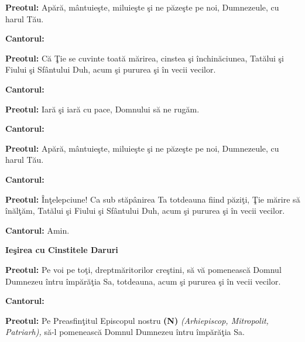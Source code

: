 \documentclass[11pt,letterpaper]{book} \usepackage{ucs}
\newcommand{\mysection}[1]{\begin{center}{\Large \bf #1}\end{center}}
\begin{document}
  {\bf Preotul:} Apără, mântuieşte, miluieşte şi ne păzeşte pe noi,
  Dumnezeule, cu harul Tău.

  {\bf Cantorul:}
  \begin{center}
  \end{center}

  {\bf Preotul:} Că Ţie se cuvinte toată mărirea, cinstea şi
  închinăciunea, Tatălui şi Fiului şi Sfântului Duh, acum şi pururea
  şi în vecii vecilor.

  {\bf Cantorul:}
  \begin{center}
  \end{center}

  {\bf Preotul:} Iară şi iară cu pace, Domnului să ne rugăm.

  {\bf Cantorul:}
  \begin{center}
  \end{center}

  {\bf Preotul:} Apără, mântuieşte, miluieşte şi ne păzeşte pe noi,
  Dumnezeule, cu harul Tău.

  {\bf Cantorul:}
  \begin{center}
  \end{center}

  {\bf Preotul:} Înţelepciune! Ca sub stăpânirea Ta totdeauna fiind
  păziţi, Ţie mărire să înălţăm, Tatălui şi Fiului şi Sfântului Duh,
  acum şi pururea şi în vecii vecilor.

  {\bf Cantorul:} Amin.


  \vspace{0.8in}

  
  \mysection{Ieşirea cu Cinstitele Daruri}

  {\bf Preotul:} Pe voi pe toţi, dreptmăritorilor creştini, să vă
  pomenească Domnul Dumnezeu întru împărăţia Sa, totdeauna, acum şi
  pururea şi în vecii vecilor.

  {\bf Cantorul:}
    
  \begin{center}
  \end{center}

  {\bf Preotul:} Pe Preasfinţitul Episcopul nostru {\bf (N)} {\em
  (Arhiepiscop, Mitropolit, Patriarh),} să-l pomenească Domnul
  Dumnezeu întru împărăţia Sa.
\end{document}
